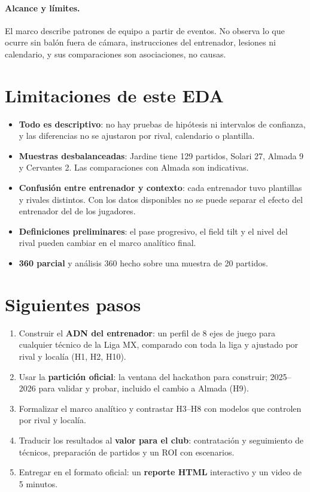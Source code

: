 \documentclass[11pt,a4paper]{article}
\begin{document}
\paragraph{Alcance y límites.} El marco describe patrones de equipo a partir de eventos. No observa lo que ocurre sin balón fuera de cámara, instrucciones del entrenador, lesiones ni calendario, y sus comparaciones son asociaciones, no causas.

\section{Limitaciones de este EDA}
\begin{itemize}
  \item \textbf{Todo es descriptivo}: no hay pruebas de hipótesis ni intervalos de confianza, y las diferencias no se ajustaron por rival, calendario o plantilla.
  \item \textbf{Muestras desbalanceadas}: Jardine tiene 129 partidos, Solari 27, Almada 9 y Cervantes 2. Las comparaciones con Almada son indicativas.
  \item \textbf{Confusión entre entrenador y contexto}: cada entrenador tuvo plantillas y rivales distintos. Con los datos disponibles no se puede separar el efecto del entrenador del de los jugadores.
  \item \textbf{Definiciones preliminares}: el pase progresivo, el field tilt y el nivel del rival pueden cambiar en el marco analítico final.
  \item \textbf{360 parcial} y análisis 360 hecho sobre una muestra de 20 partidos.
\end{itemize}

\section{Siguientes pasos}
\begin{enumerate}
  \item Construir el \textbf{ADN del entrenador}: un perfil de 8 ejes de juego para cualquier técnico de la Liga MX,
        comparado con toda la liga y ajustado por rival y localía (H1, H2, H10).
  \item Usar la \textbf{partición oficial}: la ventana del hackathon para construir; 2025--2026 para validar y probar,
        incluido el cambio a Almada (H9).
  \item Formalizar el marco analítico y contrastar H3--H8 con modelos que controlen por rival y localía.
  \item Traducir los resultados al \textbf{valor para el club}: contratación y seguimiento de técnicos, preparación de
        partidos y un ROI con escenarios.
  \item Entregar en el formato oficial: un \textbf{reporte HTML} interactivo y un video de 5 minutos.
\end{enumerate}
\end{document}

